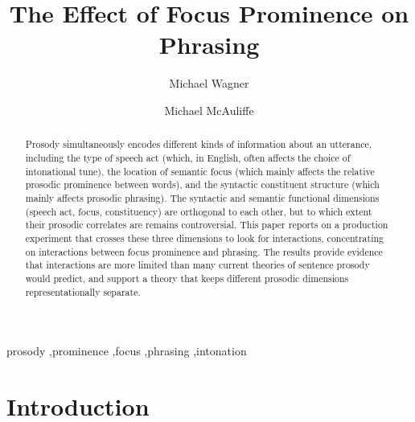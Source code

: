 \documentclass[preprint,review,12pt,authoryear,times]{elsarticle}
\begin{document}
\begin{frontmatter}


\title{The Effect of Focus Prominence on Phrasing}


\author{Michael Wagner}
\author{Michael McAuliffe}



\address{Department of Linguistics, McGill University \\ 1085 Doctor Penfield Avenue, Montr\'eal, Qu\'ebec, H3A 1A7\\Canada}

\begin{abstract}
Prosody simultaneously encodes different kinds of information about an utterance, including the type of speech act (which, in English, often affects the choice of intonational tune), the location of semantic focus (which mainly affects the relative prosodic prominence between words), and the syntactic constituent structure (which mainly affects prosodic phrasing). The syntactic and semantic functional dimensions (speech act, focus, constituency) are orthogonal to each other, but to which extent their prosodic correlates are remains controversial. This paper reports on a production experiment that crosses these three dimensions to look for interactions, concentrating on interactions between focus prominence and phrasing. The results provide evidence that interactions are more limited than many current theories of sentence prosody would predict, and support a theory that keeps different prosodic dimensions representationally separate.
\end{abstract}

\begin{keyword}

prosody \sep prominence \sep focus \sep phrasing \sep intonation

\end{keyword}

\end{frontmatter}

\section{Introduction}
 
\end{document}
